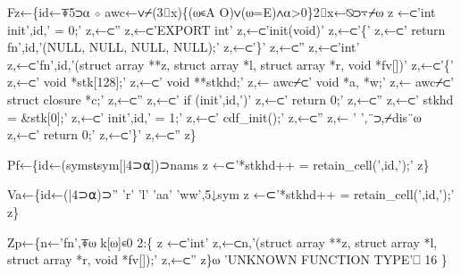 \documentclass{article}%
\begin{document}
        Fz←\{id←⍕5⊃⍺ ⋄ awc←∨⌿(3⌷x)\{(⍵∊A O)∨(⍵=E)∧⍺>0\}2⌷x←⍉⊃⍪⌿⍵
                z ←⊂'int init',id,' = 0;'
                z,←⊂''
                z,←⊂'EXPORT int'
                z,←⊂'init(void)'
                z,←⊂'\{'
                z,←⊂' return fn',id,'(NULL, NULL, NULL, NULL);'
                z,←⊂'\}'
                z,←⊂''
                z,←⊂'int'
                z,←⊂'fn',id,'(struct array **z, struct array *l, struct array *r, void *fv[])'
                z,←⊂'\{'
                z,←⊂'       void    *stk[128];'
                z,←⊂'       void    **stkhd;'
                z,← awc⌿⊂'        void    *a, *w;'
                z,← awc⌿⊂'        struct  closure *c;'
                z,←⊂''
                z,←⊂'       if (init',id,')'
                z,←⊂'               return 0;'
                z,←⊂''
                z,←⊂'       stkhd = &stk[0];'
                z,←⊂'       init',id,' = 1;'
                z,←⊂'       cdf_init();'
                z,←⊂''
                z,← ' ',¨⊃,⌿dis¨⍵
                z,←⊂'       return 0;'
                z,←⊂'\}'
                z,←⊂''
        z\}

        Pf←\{id←(syms⍳sym[|4⊃⍺])⊃nams
                z ←⊂'*stkhd++ = retain_cell(',id,');'
        z\}

        Va←\{id←(|4⊃⍺)⊃'' 'r' 'l' 'aa' 'ww',5↓sym
                z ←⊂'*stkhd++ = retain_cell(',id,');'
        z\}

        Zp←\{n←'fn',⍕⍵
                k[⍵]∊0 2:\{
                        z ←⊂'int'
                        z,←⊂n,'(struct array **z, struct array *l, struct array *r, void *fv[]);'
                        z,←⊂''
                z\}⍵
                'UNKNOWN FUNCTION TYPE'⎕ 16
        \}
\end{document}
